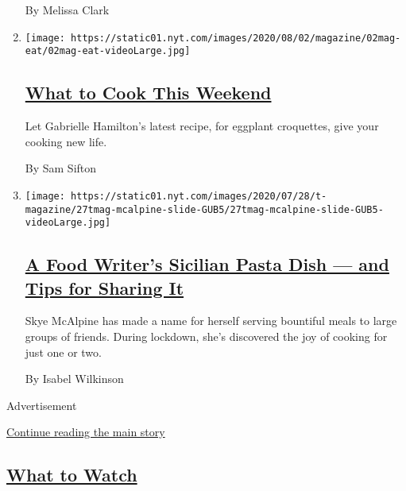 \begin{enumerate}
  By Melissa Clark
\item
  \texttt{[image: https://static01.nyt.com/images/2020/08/02/magazine/02mag-eat/02mag-eat-videoLarge.jpg]}

  \hypertarget{what-to-cook-this-weekend}{%
  \subsection{\texorpdfstring{\href{/2020/07/31/dining/what-to-cook-this-weekend.html}{What
  to Cook This
  Weekend}}{What to Cook This Weekend}}\label{what-to-cook-this-weekend}}

  Let Gabrielle Hamilton's latest recipe, for eggplant croquettes, give
  your cooking new life.

  By Sam Sifton
\item
  \texttt{[image: https://static01.nyt.com/images/2020/07/28/t-magazine/27tmag-mcalpine-slide-GUB5/27tmag-mcalpine-slide-GUB5-videoLarge.jpg]}

  \hypertarget{a-food-writers-sicilian-pasta-dish--and-tips-for-sharing-it}{%
  \subsection{\texorpdfstring{\href{/2020/07/29/t-magazine/skye-mcalpine-pasta-cooking.html}{A
  Food Writer's Sicilian Pasta Dish --- and Tips for Sharing
  It}}{A Food Writer's Sicilian Pasta Dish --- and Tips for Sharing It}}\label{a-food-writers-sicilian-pasta-dish--and-tips-for-sharing-it}}

  Skye McAlpine has made a name for herself serving bountiful meals to
  large groups of friends. During lockdown, she's discovered the joy of
  cooking for just one or two.

  By Isabel Wilkinson
\end{enumerate}

Advertisement

\protect\hyperlink{after-mid1}{Continue reading the main story}

\hypertarget{what-to-watch}{%
\subsection{\texorpdfstring{\protect\hyperlink{}{What to
Watch}}{What to Watch}}\label{what-to-watch}}

